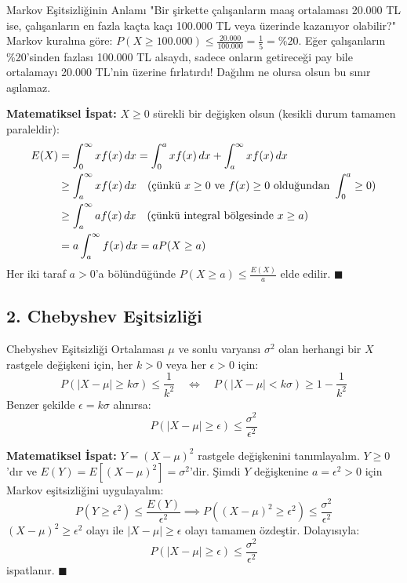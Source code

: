 \documentclass[12pt,a4paper]{article}
\begin{document}
\begin{sezgi}{Markov Eşitsizliğinin Anlamı}
"Bir şirkette çalışanların maaş ortalaması 20.000 TL ise, çalışanların en fazla kaçta kaçı 100.000 TL veya üzerinde kazanıyor olabilir?"  
Markov kuralına göre: $P(X \ge 100.000) \le \frac{20.000}{100.000} = \frac{1}{5} = \%20$.  
Eğer çalışanların \%20'sinden fazlası 100.000 TL alsaydı, sadece onların getireceği pay bile ortalamayı 20.000 TL'nin üzerine fırlatırdı! Dağılım ne olursa olsun bu sınır aşılamaz.
\end{sezgi}

\textbf{Matematiksel İspat:}
$X \ge 0$ sürekli bir değişken olsun (kesikli durum tamamen paraleldir):
\begin{align}
    E(X) &= \int_0^\infty x f(x) \, dx = \int_0^a x f(x) \, dx + \int_a^\infty x f(x) \, dx \notag \\
    &\ge \int_a^\infty x f(x) \, dx \quad (\text{çünkü } x \ge 0 \text{ ve } f(x) \ge 0 \text{ olduğundan } \int_0^a \ge 0) \notag \\
    &\ge \int_a^\infty a f(x) \, dx \quad (\text{çünkü integral bölgesinde } x \ge a) \notag \\
    &= a \int_a^\infty f(x) \, dx = a P(X \ge a)
\end{align}
Her iki taraf $a > 0$'a bölündüğünde $P(X \ge a) \le \frac{E(X)}{a}$ elde edilir. $\blacksquare$

\subsection{2. Chebyshev Eşitsizliği}
\begin{teorem}{Chebyshev Eşitsizliği}
Ortalaması $\mu$ ve sonlu varyansı $\sigma^2$ olan herhangi bir $X$ rastgele değişkeni için, her $k > 0$ veya her $\epsilon > 0$ için:
\begin{equation}
    P(|X - \mu| \ge k\sigma) \le \frac{1}{k^2} \quad \iff \quad P(|X - \mu| < k\sigma) \ge 1 - \frac{1}{k^2}
\end{equation}
Benzer şekilde $\epsilon = k\sigma$ alınırsa:
\begin{equation}
    P(|X - \mu| \ge \epsilon) \le \frac{\sigma^2}{\epsilon^2}
\end{equation}
\end{teorem}

\textbf{Matematiksel İspat:}
$Y = (X - \mu)^2$ rastgele değişkenini tanımlayalım. $Y \ge 0$'dır ve $E(Y) = E[(X-\mu)^2] = \sigma^2$'dir.  
Şimdi $Y$ değişkenine $a = \epsilon^2 > 0$ için Markov eşitsizliğini uygulayalım:
\begin{equation}
    P(Y \ge \epsilon^2) \le \frac{E(Y)}{\epsilon^2} \implies P\left((X - \mu)^2 \ge \epsilon^2\right) \le \frac{\sigma^2}{\epsilon^2}
\end{equation}
$(X - \mu)^2 \ge \epsilon^2$ olayı ile $|X - \mu| \ge \epsilon$ olayı tamamen özdeştir. Dolayısıyla:
\begin{equation}
    P(|X - \mu| \ge \epsilon) \le \frac{\sigma^2}{\epsilon^2}
\end{equation}
ispatlanır. $\blacksquare$
\end{document}
